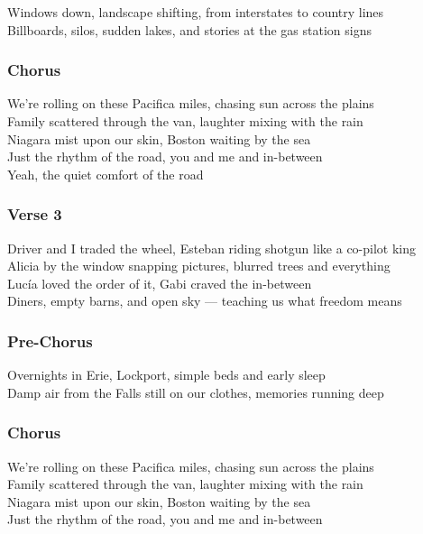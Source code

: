 Windows down, landscape shifting, from interstates to country lines\\
Billboards, silos, sudden lakes, and stories at the gas station signs

\subsubsection{Chorus}\label{chorus-63}

We're rolling on these Pacifica miles, chasing sun across the plains\\
Family scattered through the van, laughter mixing with the rain\\
Niagara mist upon our skin, Boston waiting by the sea\\
Just the rhythm of the road, you and me and in-between\\
Yeah, the quiet comfort of the road

\subsubsection{Verse 3}\label{verse-3-12}

Driver and I traded the wheel, Esteban riding shotgun like a co-pilot
king\\
Alicia by the window snapping pictures, blurred trees and everything\\
Lucía loved the order of it, Gabi craved the in-between\\
Diners, empty barns, and open sky --- teaching us what freedom means

\subsubsection{Pre-Chorus}\label{pre-chorus-42}

Overnights in Erie, Lockport, simple beds and early sleep\\
Damp air from the Falls still on our clothes, memories running deep

\subsubsection{Chorus}\label{chorus-64}

We're rolling on these Pacifica miles, chasing sun across the plains\\
Family scattered through the van, laughter mixing with the rain\\
Niagara mist upon our skin, Boston waiting by the sea\\
Just the rhythm of the road, you and me and in-between

